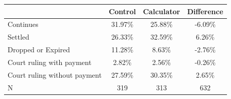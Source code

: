 \begin{tabular}{l|ccc}
\toprule
      & Control & Calculator & Difference \\
\midrule
Continues & 31.97\% & 25.88\% & -6.09\% \\
Settled & 26.33\% & 32.59\% & 6.26\% \\
Dropped or Expired & 11.28\% & 8.63\% & -2.76\% \\
Court ruling with payment & 2.82\% & 2.56\% & -0.26\% \\
Court ruling without payment & 27.59\% & 30.35\% & 2.65\% \\
N     & 319   & 313   & 632 \\
\bottomrule
\bottomrule
\end{tabular}%

